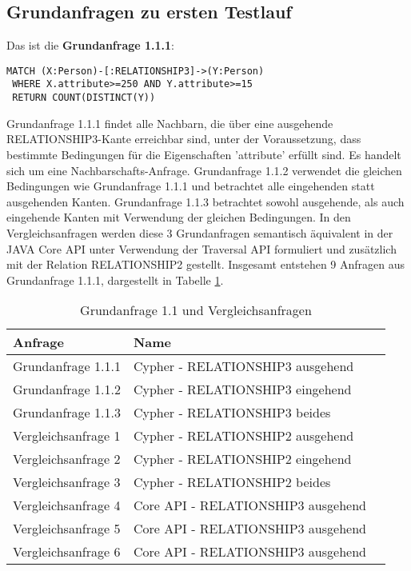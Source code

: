 \subsection{Grundanfragen zu ersten Testlauf}
Das ist die \textbf{Grundanfrage 1.1.1}: 
\begin{Verbatim}[frame=single]
 MATCH (X:Person)-[:RELATIONSHIP3]->(Y:Person) 
 WHERE X.attribute>=250 AND Y.attribute>=15  
 RETURN COUNT(DISTINCT(Y))
\end{Verbatim} 
Grundanfrage 1.1.1 findet alle Nachbarn, die über eine ausgehende RELATIONSHIP3-Kante erreichbar sind, unter der Voraussetzung, dass bestimmte Bedingungen für die Eigenschaften 'attribute' erfüllt sind. Es handelt sich um eine Nachbarschafts-Anfrage.
 Grundanfrage 1.1.2 verwendet die gleichen Bedingungen wie Grundanfrage 1.1.1 und betrachtet alle eingehenden statt ausgehenden Kanten. Grundanfrage 1.1.3 betrachtet sowohl ausgehende, als auch eingehende Kanten mit Verwendung der gleichen Bedingungen. In den Vergleichsanfragen werden diese 3 Grundanfragen semantisch äquivalent in der JAVA Core API unter Verwendung der Traversal API formuliert und zusätzlich mit der Relation RELATIONSHIP2 gestellt. Insgesamt entstehen 9 Anfragen aus Grundanfrage 1.1.1, dargestellt in Tabelle \ref{tab:Intro_Query2_1}.
\FloatBarrier
\begin{table}[h]
	\centering
	\begin{tabular}{ |p{5cm}||p{7cm}|p{3cm}  }
		\hline
		Anfrage& Name\\
		\hline
		Grundanfrage 1.1.1 &  Cypher - RELATIONSHIP3 ausgehend\\
		Grundanfrage 1.1.2 &  Cypher - RELATIONSHIP3 eingehend\\
		Grundanfrage 1.1.3 &  Cypher - RELATIONSHIP3 beides\\
		Vergleichsanfrage 1 &  Cypher - RELATIONSHIP2 ausgehend\\
		Vergleichsanfrage 2 &  Cypher - RELATIONSHIP2 eingehend\\
		Vergleichsanfrage 3 &  Cypher - RELATIONSHIP2 beides\\
		Vergleichsanfrage 4 &  Core API - RELATIONSHIP3 ausgehend\\
		Vergleichsanfrage 5 &  Core API - RELATIONSHIP3 ausgehend\\
		Vergleichsanfrage 6 &  Core API - RELATIONSHIP3 ausgehend\\
		\hline
	\end{tabular}
	\caption{Grundanfrage 1.1 und Vergleichsanfragen}
	\label{tab:Intro_Query2_1}
\end{table}
\FloatBarrier

